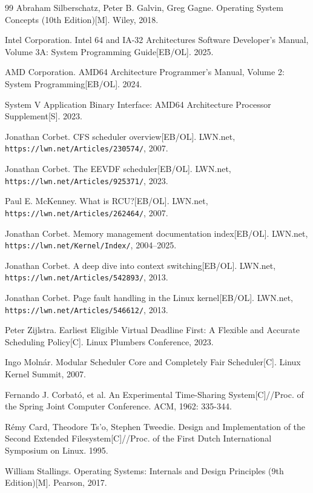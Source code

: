 \documentclass[a4paper]{article}
\begin{document}
\begin{thebibliography}{99}
 Abraham Silberschatz, Peter B. Galvin, Greg Gagne. Operating System Concepts (10th Edition)[M]. Wiley, 2018.

 Intel Corporation. Intel 64 and IA-32 Architectures Software Developer's Manual, Volume 3A: System Programming Guide[EB/OL]. 2025.

 AMD Corporation. AMD64 Architecture Programmer's Manual, Volume 2: System Programming[EB/OL]. 2024.

 System V Application Binary Interface: AMD64 Architecture Processor Supplement[S]. 2023.

 Jonathan Corbet. CFS scheduler overview[EB/OL]. LWN.net, \texttt{https://lwn.net/Articles/230574/}, 2007.

 Jonathan Corbet. The EEVDF scheduler[EB/OL]. LWN.net, \texttt{https://lwn.net/Articles/925371/}, 2023.

 Paul E. McKenney. What is RCU?[EB/OL]. LWN.net, \texttt{https://lwn.net/Articles/262464/}, 2007.

 Jonathan Corbet. Memory management documentation index[EB/OL]. LWN.net, \texttt{https://lwn.net/Kernel/Index/}, 2004–2025.

 Jonathan Corbet. A deep dive into context switching[EB/OL]. LWN.net, \texttt{https://lwn.net/Articles/542893/}, 2013.

 Jonathan Corbet. Page fault handling in the Linux kernel[EB/OL]. LWN.net, \texttt{https://lwn.net/Articles/546612/}, 2013.

 Peter Zijlstra. Earliest Eligible Virtual Deadline First: A Flexible and Accurate Scheduling Policy[C]. Linux Plumbers Conference, 2023.

 Ingo Molnár. Modular Scheduler Core and Completely Fair Scheduler[C]. Linux Kernel Summit, 2007.

 Fernando J. Corbató, et al. An Experimental Time-Sharing System[C]//Proc. of the Spring Joint Computer Conference. ACM, 1962: 335-344.

 Rémy Card, Theodore Ts'o, Stephen Tweedie. Design and Implementation of the Second Extended Filesystem[C]//Proc. of the First Dutch International Symposium on Linux. 1995.

 William Stallings. Operating Systems: Internals and Design Principles (9th Edition)[M]. Pearson, 2017.

\end{thebibliography}
\end{document}
